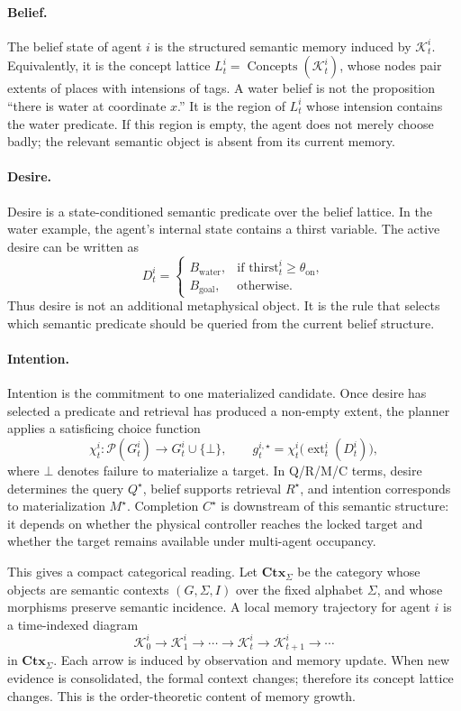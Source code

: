 \documentclass{article}
\begin{document}
\paragraph{Belief.} The belief state of agent $i$ is the structured
semantic memory induced by $\mathcal{K}_t^i$. Equivalently, it is the
concept lattice $L_t^i=\operatorname{Concepts}(\mathcal{K}_t^i)$, whose
nodes pair extents of places with intensions of tags. A water belief is
not the proposition ``there is water at coordinate $x$.'' It is the
region of $L_t^i$ whose intension contains the water predicate. If this
region is empty, the agent does not merely choose badly; the relevant
semantic object is absent from its current memory.

\paragraph{Desire.} Desire is a state-conditioned semantic predicate
over the belief lattice. In the water example, the agent's internal
state contains a thirst variable. The active desire can be written as
\[
D_t^i =
\begin{cases}
B_{\mathrm{water}}, & \text{if } \mathrm{thirst}_t^i\geq\theta_{\mathrm{on}},\\
B_{\mathrm{goal}}, & \text{otherwise.}
\end{cases}
\]
Thus desire is not an additional metaphysical object. It is the rule
that selects which semantic predicate should be queried from the
current belief structure.

\paragraph{Intention.} Intention is the commitment to one materialized
candidate. Once desire has selected a predicate and retrieval has
produced a non-empty extent, the planner applies a satisficing choice
function
\[
\chi_t^i:\mathcal{P}(G_t^i)\rightarrow G_t^i\cup\{\bot\},
\qquad
g_t^{i,\star}=\chi_t^i\!\big(\operatorname{ext}_t^i(D_t^i)\big),
\]
where $\bot$ denotes failure to materialize a target. In Q/R/M/C terms,
desire determines the query $Q^\star$, belief supports retrieval
$R^\star$, and intention corresponds to materialization $M^\star$.
Completion $C^\star$ is downstream of this semantic structure: it
depends on whether the physical controller reaches the locked target
and whether the target remains available under multi-agent occupancy.

This gives a compact categorical reading. Let $\mathbf{Ctx}_\Sigma$ be
the category whose objects are semantic contexts $(G,\Sigma,I)$ over the
fixed alphabet $\Sigma$, and whose morphisms preserve semantic
incidence. A local memory trajectory for agent $i$ is a time-indexed
diagram
\[
\mathcal{K}_0^i\rightarrow\mathcal{K}_1^i\rightarrow\cdots
\rightarrow\mathcal{K}_t^i\rightarrow\mathcal{K}_{t+1}^i\rightarrow\cdots
\]
in $\mathbf{Ctx}_\Sigma$. Each arrow is induced by observation and
memory update. When new evidence is consolidated, the formal context
changes; therefore its concept lattice changes. This is the
order-theoretic content of memory growth.
\end{document}
